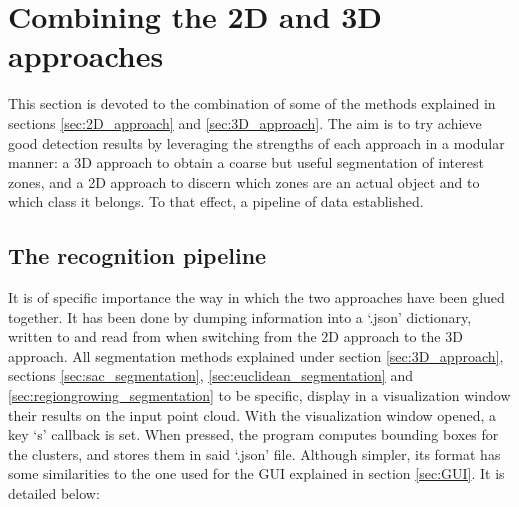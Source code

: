\documentclass[../main.tex]{subfiles}
\begin{document}
\section{Combining the 2D and 3D approaches} \label{sec:2D_3D_approaches}
This section is devoted to the combination of some of the methods explained in sections \ref{sec:2D_approach} and \ref{sec:3D_approach}. The aim is to try achieve good detection results by leveraging the strengths of each approach in a modular manner: a 3D approach to obtain a coarse but useful segmentation of interest zones, and a 2D approach to discern which zones are an actual object and to which class it belongs. To that effect, a pipeline of data established. 

\subsection{The recognition pipeline}
It is of specific importance the way in which the two approaches have been glued together. It has been done by dumping information into a `.json' dictionary, written to and read from when switching from the 2D approach to the 3D approach. All segmentation methods explained under section \ref{sec:3D_approach}, sections \ref{sec:sac_segmentation}, \ref{sec:euclidean_segmentation} and \ref{sec:regiongrowing_segmentation} to be specific, display in a visualization window their results on the input point cloud. With the visualization window opened, a key `s' callback is set. When pressed, the program computes bounding boxes for the clusters, and stores them in said `.json' file. Although simpler, its format has some similarities to the one used for the GUI explained in section \ref{sec:GUI}. It is detailed below:
\end{document}
